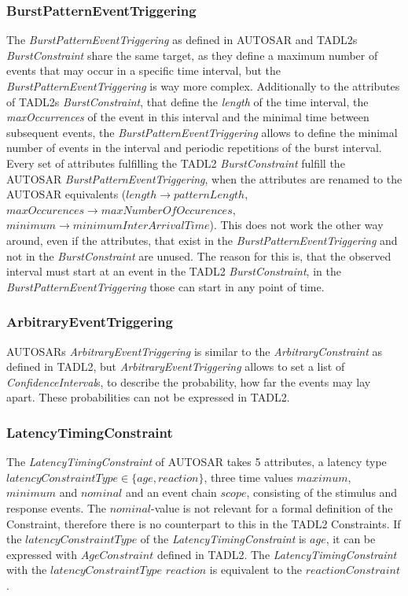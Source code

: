 	\subsubsection{BurstPatternEventTriggering}
		The \emph{BurstPatternEventTriggering} as defined in AUTOSAR and TADL2s \emph{BurstConstraint} share the same target, as they define a maximum number of events that may occur in a specific time interval, but the \emph{BurstPatternEventTriggering} is way more complex. Additionally to the attributes of TADL2s \emph{BurstConstraint}, that define the \emph{length} of the time interval, the \emph{maxOccurrences} of the event in this interval and the minimal time between subsequent events, the \emph{BurstPatternEventTriggering} allows to define the minimal number of events in the interval and periodic repetitions of the burst interval.\\
		Every set of attributes fulfilling the TADL2 \emph{BurstConstraint} fulfill the AUTOSAR \emph{BurstPatternEventTriggering}, when the attributes are renamed to the AUTOSAR equivalents ($length\rightarrow patternLength$, $maxOccurences\rightarrow maxNumberOfOccurences$, $minimum\rightarrow minimumInterArrivalTime$). This does not work the other way around, even if the attributes, that exist in the \emph{BurstPatternEventTriggering} and not in the \emph{BurstConstraint} are unused. The reason for this is, that the observed interval must start at an event in the TADL2 \emph{BurstConstraint}, in the \emph{BurstPatternEventTriggering} those can start in any point of time.
		
	\subsubsection{ArbitraryEventTriggering}
		AUTOSARs \emph{ArbitraryEventTriggering} is similar to the \emph{ArbitraryConstraint} as defined in TADL2, but \emph{ArbitraryEventTriggering} allows to set a list of \emph{ConfidenceInterval}s, to describe the probability, how far the events may lay apart. These probabilities can not be expressed in TADL2.
		
	\subsubsection{LatencyTimingConstraint}
		The \emph{LatencyTimingConstraint} of AUTOSAR takes 5 attributes, a latency type $latencyConstraintType\in \{age, reaction\}$, three time values $maximum$, $minimum$ and $nominal$ and an event chain $scope$, consisting of the stimulus and response events. The $nominal$-value is not relevant for a formal definition of the Constraint, therefore there is no counterpart to this in the TADL2 Constraints. If the $latencyConstraintType$ of the \emph{LatencyTimingConstraint} is $age$, it can be expressed with $AgeConstraint$ defined in TADL2. The \emph{LatencyTimingConstraint} with the $latencyConstraintType$ $reaction$ is equivalent to the $reactionConstraint$.
	
